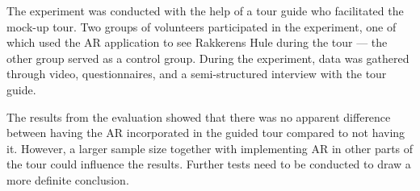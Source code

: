 The experiment was conducted with the help of a tour guide who facilitated the mock-up tour. Two groups of volunteers participated in the experiment, one of which used the AR application to see Rakkerens Hule during the tour --- the other group served as a control group. During the experiment, data was gathered through video, questionnaires, and a semi-structured interview with the tour guide.

The results from the evaluation showed that there was no apparent difference between having the AR incorporated in the guided tour compared to not having it. However, a larger sample size together with implementing AR in other parts of the tour could influence the results. Further tests need to be conducted to draw a more definite conclusion.